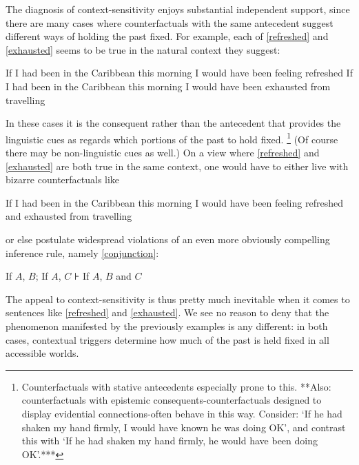 \documentclass[If.tex]{subfiles}
\begin{document}
The diagnosis of context-sensitivity enjoys substantial independent support, since there are many cases where counterfactuals with the same antecedent suggest different ways of holding the past fixed. For example, each of \ref{refreshed} and \ref{exhausted} seems to be true in the natural context they suggest:
\begin{prop}
	\nitem \label{refreshed}
		If I had been in the Caribbean this morning I would have been feeling refreshed
	\nitem \label{exhausted}
		If I had been in the Caribbean this morning I would have been exhausted from travelling
\end{prop}
In these cases it is the consequent rather than the antecedent that provides the linguistic cues as regards which portions of the past to hold fixed.%
\footnote{Counterfactuals with stative antecedents especially prone to this.  **Also: counterfactuals with epistemic consequents-counterfactuals designed to display evidential connections-often behave in this way.  Consider: ‘If he had shaken my hand firmly, I would have known he was doing OK’, and contrast this with ‘If he had shaken my hand firmly, he would have been doing OK’.***}  
(Of course there may be non-linguistic cues as well.) On a view where \ref{refreshed} and \ref{exhausted} are both true in the same context, one would have to either live with bizarre counterfactuals like
\begin{prop}
	\nitem \label{refreshedexhausted}
		If I had been in the Caribbean this morning I would have been feeling refreshed and exhausted from travelling
\end{prop}
or else postulate widespread violations of an even more obviously compelling inference rule, namely \ref{conjunction}:
\begin{prop}  
	\litem[Conjunction] \label{conjunction}
	If $A$, $B$; If $A$, $C$ ⊦ If $A$, $B$ and $C$ 
\end{prop}
The appeal to context-sensitivity is thus pretty much inevitable when it comes to sentences like \ref{refreshed} and \ref{exhausted}. We see no reason to deny that the phenomenon manifested by the previously examples is any different: in both cases, contextual triggers determine how much of the past is held fixed in all accessible worlds.
\end{document}

